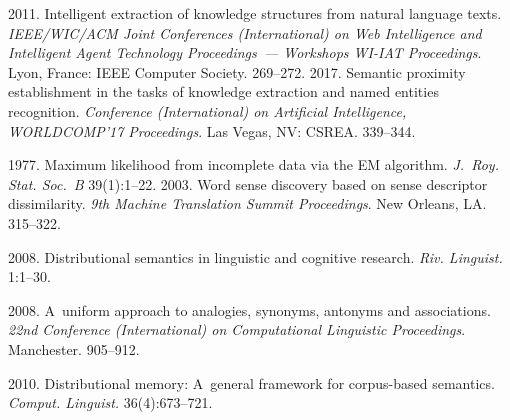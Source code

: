  \begin{multicols}{2}

\renewcommand{\bibname}{\protect\rmfamily References}

{\small\frenchspacing
 {%
 \begin{thebibliography}{99}
 2011. Intelligent extraction 
of knowledge structures from natural language texts. \textit{IEEE/WIC/ACM Joint 
Conferences (International) on Web Intelligence and Intelligent Agent Technology 
Proceedings~--- Workshops WI-IAT Proceedings}. Lyon, 
France: IEEE Computer Society. 269--272. 
 2017. 
Semantic proximity establishment in the tasks of knowledge extraction and named entities 
recognition. \textit{Conference (International) on Artificial Intelligence, 
WORLDCOMP'17 Proceedings}.  Las Vegas, NV: CSREA. 339--344.

 1977. Maximum likelihood from 
incomplete data via the EM algorithm. \textit{J.~Roy. Stat. Soc.~B} 39(1):1--22.
 2003. Word sense discovery based on sense descriptor dissimilarity. \textit{9th 
Machine Translation Summit Proceedings}. New Orleans, LA. 315--322.

 2008. Distributional semantics in linguistic and cognitive research. 
\textit{Riv. Linguist.} 1:1--30.


 2008. A~uniform approach to analogies, synonyms, antonyms and 
associations. \textit{22nd 
Conference (International) on Computational Linguistic Proceedings}. Manchester. 905--912.

 2010. Distributional memory: A~general framework for 
corpus-based semantics. \textit{Comput. Linguist.} 36(4):673--721.


\end{thebibliography}}}
\end{multicols}
